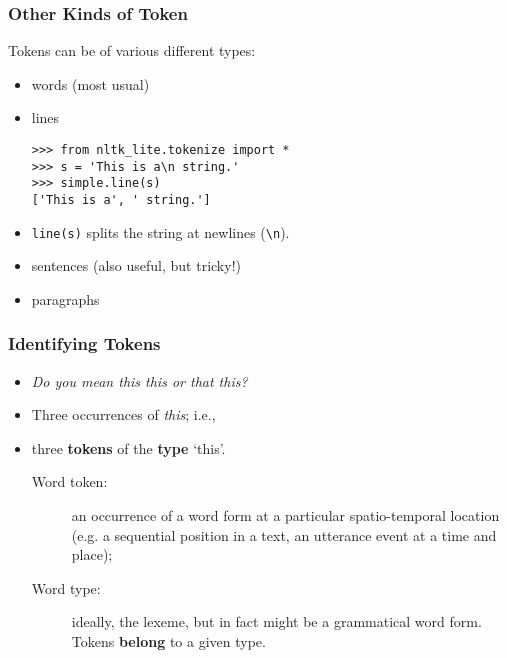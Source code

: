 \begin{frame}[fragile]
  \frametitle{Other Kinds of Token}

Tokens can be of various different types:
\begin{itemize}[<+->]
\item words (most usual)
\item lines
\begin{verbatim}
>>> from nltk_lite.tokenize import *
>>> s = 'This is a\n string.' 
>>> simple.line(s)
['This is a', ' string.'] 
\end{verbatim}

\item \verb!line(s)! splits the string at newlines (\verb!\n!).
\item sentences (also useful, but tricky!)
\item paragraphs
\end{itemize}


\end{frame}


\begin{frame}[fragile]
  \frametitle{Identifying Tokens}

    \begin{itemize}[<+->]
    \item \textit{Do you mean this this or that this?}
    \item Three occurrences of \textit{this}; i.e.,
    \item three \textbf{tokens} of the \textbf{type} `this'.
    \begin{description}
    \item [Word token:] an occurrence of a word form at a particular
      spatio-temporal location (e.g. a sequential position in a text,
      an utterance event at a time and place);
    \item [Word type:] ideally, the lexeme, but in fact might be a
      grammatical word form.
      Tokens \textbf{belong} to a given type. 
      \end{description}
    \end{itemize}
\end{frame}

